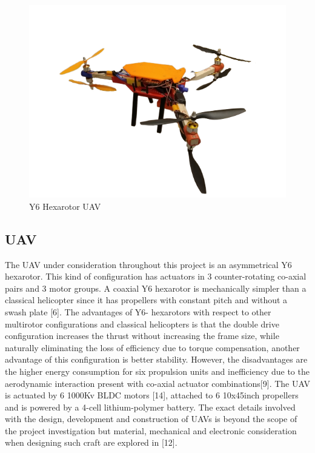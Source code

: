 \documentclass[12pt,a4paper,twoside]{report}
\begin{document}
		\newpage
		
		\begin{figure}[h!]
			\centering
			\includegraphics[width=0.8\linewidth]{Y6UAV1-removebg-preview.png}
			\caption{Y6 Hexarotor UAV}
			\label{fig:Y6Hexarotor}
		\end{figure}
		\space
		\subsection{UAV}
			The UAV under consideration throughout this project is an asymmetrical Y6 hexarotor. This kind of configuration has actuators in 3 counter-rotating co-axial pairs and 3 motor groups. A coaxial Y6 hexarotor is mechanically simpler than a classical helicopter since it has propellers with constant pitch and without a swash plate [6]. The advantages of Y6- hexarotors with respect to other multirotor configurations and classical helicopters is that the double drive configuration increases the thrust without increasing the frame size, while naturally eliminating the loss of efficiency due to torque compensation, another advantage of this configuration is better stability. However, the disadvantages are the higher energy consumption for six propulsion units and inefficiency due to the aerodynamic interaction present with co-axial actuator combinations[9]. The UAV is actuated by 6 1000Kv BLDC motors [14], attached to 6 10x45inch propellers and is powered by a 4-cell lithium-polymer battery. The exact details involved with the design, development and construction of UAVs is beyond the scope of the project investigation but material, mechanical and electronic consideration when designing such craft are explored in [12].
			
			\newpage
			
\end{document}
